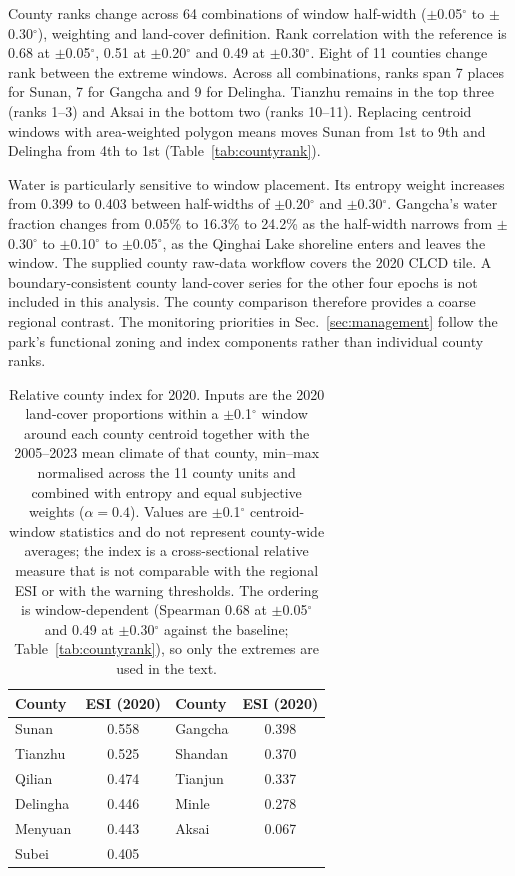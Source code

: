 \documentclass[preprint,11pt,authoryear]{elsarticle}
\begin{document}
County ranks change across 64 combinations of window half-width ($\pm$0.05$^{\circ}$ to $\pm$0.30$^{\circ}$), weighting and land-cover definition. Rank correlation with the reference is 0.68 at $\pm$0.05$^{\circ}$, 0.51 at $\pm$0.20$^{\circ}$ and 0.49 at $\pm$0.30$^{\circ}$. Eight of 11 counties change rank between the extreme windows. Across all combinations, ranks span 7 places for Sunan, 7 for Gangcha and 9 for Delingha. Tianzhu remains in the top three (ranks 1--3) and Aksai in the bottom two (ranks 10--11). Replacing centroid windows with area-weighted polygon means moves Sunan from 1st to 9th and Delingha from 4th to 1st (Table~\ref{tab:countyrank}).

Water is particularly sensitive to window placement. Its entropy weight increases from 0.399 to 0.403 between half-widths of $\pm$0.20$^{\circ}$ and $\pm$0.30$^{\circ}$. Gangcha's water fraction changes from 0.05\% to 16.3\% to 24.2\% as the half-width narrows from $\pm$0.30$^{\circ}$ to $\pm$0.10$^{\circ}$ to $\pm$0.05$^{\circ}$, as the Qinghai Lake shoreline enters and leaves the window. The supplied county raw-data workflow covers the 2020 CLCD tile. A boundary-consistent county land-cover series for the other four epochs is not included in this analysis. The county comparison therefore provides a coarse regional contrast. The monitoring priorities in Sec.~\ref{sec:management} follow the park's functional zoning and index components rather than individual county ranks.

\begin{table}[htbp]
\centering
\caption{Relative county index for 2020. Inputs are the 2020 land-cover proportions within a $\pm$0.1$^{\circ}$ window around each county centroid together with the 2005--2023 mean climate of that county, min--max normalised across the 11 county units and combined with entropy and equal subjective weights ($\alpha = 0.4$). Values are $\pm$0.1$^{\circ}$ centroid-window statistics and do not represent county-wide averages; the index is a cross-sectional relative measure that is not comparable with the regional ESI or with the warning thresholds. The ordering is window-dependent (Spearman 0.68 at $\pm$0.05$^{\circ}$ and 0.49 at $\pm$0.30$^{\circ}$ against the baseline; Table~\ref{tab:countyrank}), so only the extremes are used in the text.}
\label{tab:county}
\small
\begin{tabular}{lclc}
\toprule
County & ESI (2020) & County & ESI (2020) \\
\midrule
Sunan & 0.558 & Gangcha & 0.398 \\
Tianzhu & 0.525 & Shandan & 0.370 \\
Qilian & 0.474 & Tianjun & 0.337 \\
Delingha & 0.446 & Minle & 0.278 \\
Menyuan & 0.443 & Aksai & 0.067 \\
Subei & 0.405 & & \\
\bottomrule
\end{tabular}
\end{table}
\end{document}
